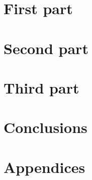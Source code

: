 \documentclass[%
]{phdthesis}
\begin{document}
	
	\thesisStartOfBody
	
	\part{First part}
	
	
	\part{Second part}
	
	\part{Third part}
	
	
	\part{Conclusions}
	
	\thesisReferences
	\thesisAppendix
	\part{Appendices}
	
	
\end{document}
